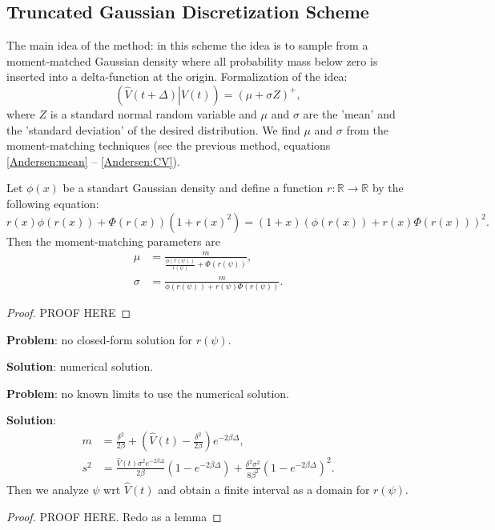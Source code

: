         \subsection{Truncated Gaussian Discretization Scheme}
            The main idea of the method: in this scheme the idea is to sample from a moment-matched Gaussian density where all probability
            mass below zero is inserted into a delta-function at the origin. Formalization of the idea:
            \begin{equation}
                \left(\left.\hat{V}(t+\Delta)\right| V(t)\right) = \left(\mu + \sigma Z\right)^+,
            \end{equation}
            where $Z$ is a standard normal random variable and $\mu$ and $\sigma$ are the 'mean' and the 'standard deviation' of the desired distribution.
            We find $\mu$ and $\sigma$ from the moment-matching techniques (see the previous method,  equations \eqref{Andersen:mean} -- \eqref{Andersen:CV}).

            \begin{lemma}
                Let $\phi(x)$ be a standart Gaussian density and define a function $r:\mathbb{R} \to \mathbb{R}$ by the following equation:
                \begin{equation}
                    r(x)\phi(r(x))+\Phi(r(x))(1+r(x)^2)= (1+x)\left(\phi(r(x)) + r(x)\Phi(r(x))\right)^2.
                \end{equation}
                Then the moment-matching parameters are
                \begin{align}
                    \mu &= \frac{m}{\frac{\phi(r(\psi))}{r(\psi)} + \Phi(r(\psi))},\\ 
                    \sigma &= \frac{m}{\phi(r(\psi)) + r(\psi)\Phi(r(\psi))}.
                \end{align}
            \end{lemma}
            \begin{proof}
                {\color{red}PROOF HERE}
            \end{proof}
            \textbf{Problem}: no closed-form solution for $r(\psi)$. 
        
        \textbf{Solution}: numerical solution.

        \textbf{Problem}: no known limits to use the numerical solution.

        \textbf{Solution}: 
        \begin{align}
            m   &= \frac{\delta^2}{2\beta} + \left(\hat{V}(t) - \frac{\delta^2}{2\beta}\right)e^{-2\beta \Delta},\\
            s^2 &= \frac{\hat{V}(t)\sigma^2e^{-2\beta \Delta}}{2\beta}\left(1 - e^{-2\beta \Delta}\right) + \frac{\delta^2\sigma^2}{8\beta^2}\left(1 - e^{-2\beta \Delta}\right)^2.
        \end{align}
        Then we analyze $\psi$ wrt $\hat{V}(t)$ and obtain a finite interval as a domain for $r(\psi)$.
        \begin{proof}
            {\color{red}PROOF HERE. Redo as a lemma}
            
        \end{proof}